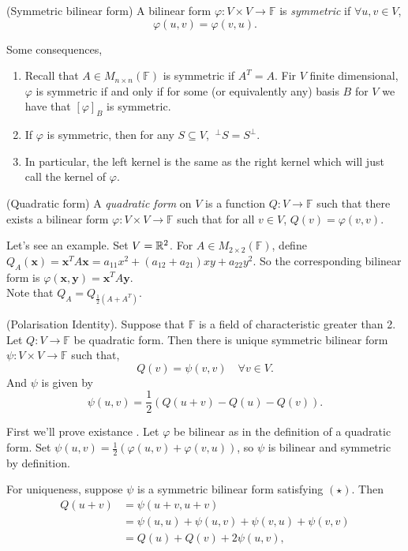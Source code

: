 \documentclass{article}
\newcommand{\F}{\mathbb{F}}
\begin{document}
\begin{definition}
	(Symmetric bilinear form) A bilinear form $ \varphi:V\times V\to \F $ is \textit{symmetric} if $ \forall u,v\in V $,
	\[
	  \varphi(u,v)=\varphi(v,u).
	\]
\end{definition}
\begin{remark}
  Some consequences,
  \begin{enumerate}
	  \item Recall that $ A\in M_{n\times n}(\F) $ is symmetric if $ A^T=A $. Fir $ V $ finite dimensional, $ \varphi $ is symmetric if and only if for some (or equivalently any) basis $ B $ for $ V $ we have that $ [\varphi]_B $ is symmetric.
	  \item If $ \varphi $ is symmetric, then for any $ S\subseteq V $, $ \ ^\perp S=S^\perp $.
	  \item In particular, the left kernel is the same as the right kernel which will just call the kernel of $ \varphi $.
  \end{enumerate}
\end{remark}
\begin{definition}
	(Quadratic form) A \textit{quadratic form} on $ V $ is a function $ Q:V\to \F $ such that there exists a bilinear form $ \varphi: V\times V\to \F $ such that for all $ v\in V $, $ Q(v)=\varphi(v,v) $.
\end{definition}
Let's see an example. Set $ V=\mathbb{R}^2 $. For $ A\in M_{2\times 2}(\F) $, define $ Q_A(\mathbf x)=\mathbf x^TA\mathbf x = a_{11}x^2+(a_{12}+a_{21})xy+a_{22}y^2 $. So the corresponding bilinear form is $ \varphi(\mathbf x,\mathbf y)=\mathbf x^TA\mathbf y $.\\
Note that $ Q_A=Q_{\frac 12(A+A^T)} $.
\begin{proposition}
	(Polarisation Identity). Suppose that $ \F $ is a field of characteristic greater than 2. Let $ Q:V\to \F $ be quadratic form. Then there is unique symmetric bilinear form $ \psi:V\times V\to \F $ such that,
	\[
		Q(v)=\psi(v,v)\quad \forall v\in V.\tag{\star}
	\]
And $ \psi $ is given by
\[
	\psi(u,v)=\frac 12(Q(u+v)-Q(u)-Q(v)).\tag{\dagger}
\]
\end{proposition}
\pf First we'll prove existance . Let $ \varphi $ be bilinear as in the definition of a quadratic form. Set $ \psi(u,v)=\frac 12(\varphi(u,v)+\varphi(v,u)) $, so $ \psi $ is bilinear and symmetric by definition.\par
For uniqueness, suppose $ \psi $ is a symmetric bilinear form satisfying $ (\star) $. Then 
\begin{align*}
	Q(u+v)&=\psi(u+v,u+v)\\
	      &=\psi(u,u)+\psi(u,v)+\psi(v,u)+\psi(v,v) \\
	      &= Q(u)+Q(v)+2\psi(u,v),
\end{align*}
\end{document}
